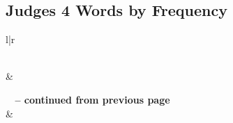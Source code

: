

\subsection{Judges 4 Words by Frequency}


\normalsize
 
\begin{center}
\begin{longtable}{l|r}
\caption[Judges 4 Words by Frequency]{Judges 4 Words by Frequency}\label{table:WordsbyFrequency for Judges 4} \\
\hline {} &  \\ \hline 
\endfirsthead
 
{{\bfseries \tablename\ \thetable{} -- continued from previous page}} \\  
\hline {} &  \\ \hline 
\endhead
 

\end{longtable}
\end{center}

